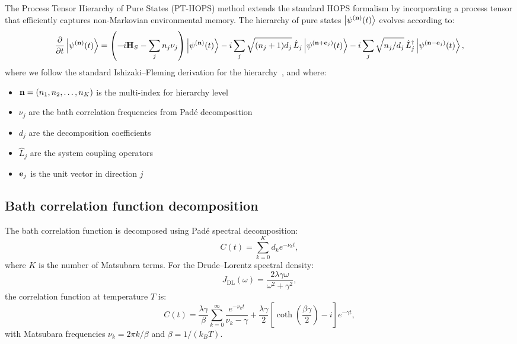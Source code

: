 \documentclass[11pt,a4paper]{article}
\begin{document}
The Process Tensor Hierarchy of Pure States (PT-HOPS) method extends the standard HOPS formalism by incorporating a process tensor that efficiently captures non-Markovian environmental memory. The hierarchy of pure states $\ket{\psi^{(\vb{n})}(t)}$ evolves according to:
\begin{equation}
\pdv{t}\ket{\psi^{(\vb{n})}(t)} = \left(-i\vb{H}_S - \sum_{j} n_j \nu_j\right)\ket{\psi^{(\vb{n})}(t)} 
- i\sum_{j} \sqrt{(n_j+1)d_j} \, \hat{L}_j \ket{\psi^{(\vb{n}+\vb{e}_j)}(t)} 
- i\sum_{j} \sqrt{n_j/d_j} \, \hat{L}_j^\dagger \ket{\psi^{(\vb{n}-\vb{e}_j)}(t)},
\label{eq:SI_hops}
\end{equation}
where we follow the standard Ishizaki--Fleming derivation for the hierarchy~\cite{Ishizaki2009a,Strathearn2018}, and where:
\begin{itemize}
\item $\vb{n} = (n_1, n_2, \ldots, n_K)$ is the multi-index for hierarchy level
\item $\nu_j$ are the bath correlation frequencies from Padé decomposition
\item $d_j$ are the decomposition coefficients
\item $\hat{L}_j$ are the system coupling operators
\item $\vb{e}_j$ is the unit vector in direction $j$
\end{itemize}

\subsection{Bath correlation function decomposition}

The bath correlation function is decomposed using Padé spectral decomposition:
\begin{equation}
C(t) = \sum_{k=0}^{K} d_k e^{-\nu_k t},
\label{eq:SI_bath_correlation}
\end{equation}
where $K$ is the number of Matsubara terms. For the Drude--Lorentz spectral density:
\begin{equation}
J_{\mathrm{DL}}(\omega) = \frac{2\lambda\gamma\omega}{\omega^2 + \gamma^2},
\label{eq:SI_drude_lorentz}
\end{equation}
the correlation function at temperature $T$ is:
\begin{equation}
C(t) = \frac{\lambda\gamma}{\beta}\sum_{k=0}^{\infty} \frac{e^{-\nu_k t}}{\nu_k - \gamma} + \frac{\lambda\gamma}{2}\left[\coth\left(\frac{\beta\gamma}{2}\right) - i\right]e^{-\gamma t},
\label{eq:SI_correlation_DL}
\end{equation}
with Matsubara frequencies $\nu_k = 2\pi k/\beta$ and $\beta = 1/(k_B T)$.
\end{document}

